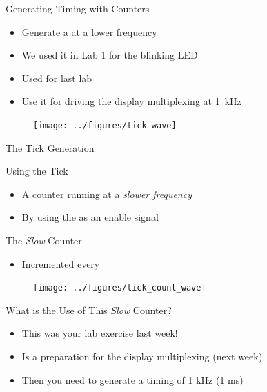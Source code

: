 \begin{frame}[fragile]{Generating Timing with Counters}
\begin{itemize}
\item Generate a  at a lower frequency
\item We used it in Lab 1 for the blinking LED
\item Used for last lab
\item Use it for driving the display multiplexing at 1~kHz
\end{itemize}
\begin{figure}
  \texttt{[image: ../figures/tick\_wave]}
\end{figure}
\end{frame}


\begin{frame}[fragile]{The Tick Generation}
\end{frame}

\begin{frame}[fragile]{Using the Tick}
\begin{itemize}
\item A counter running at a \emph{slower frequency}
\item By using the  as an enable signal
\end{itemize}
\end{frame}

\begin{frame}[fragile]{The \emph{Slow} Counter}
\begin{itemize}
\item Incremented every 
\end{itemize}
\begin{figure}
  \texttt{[image: ../figures/tick\_count\_wave]}
\end{figure}
\end{frame}

\begin{frame}[fragile]{What is the Use of This \emph{Slow} Counter?}
\begin{itemize}
\item This was your lab exercise last week!
\item Is a preparation for the display multiplexing (next week)
\item Then you need to generate a timing of 1 kHz (1 ms)
\end{itemize}
\end{frame}

